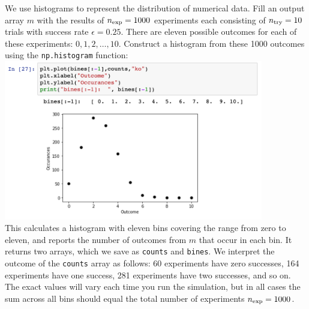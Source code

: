 We use histograms to represent the distribution of numerical data.
Fill an output array $m$ with the results of $n_{\rm exp} = 1000$
experiments each consisting of $n_{\rm try}=10$ trials with success rate
$\epsilon=0.25$.  There are eleven possible outcomes for each of these
experiments: $0,1,2,\ldots,10$.  Construct a histogram from these 1000
outcomes using the {\tt np.histogram} function:\\
\includegraphics[width=0.85\textwidth]{figs/labs/distributions/makehist.png} \\
This calculates a histogram with eleven bins covering the range from
zero to eleven, and reports the number of outcomes from $m$ that occur
in each bin.  It returns two arrays, which we save as {\tt counts} and
{\tt bines}.  We interpret the outcome of the {\tt counts} array as follows:  60
experiments have zero successes, 164 experiments have one success, 281
experiments have two successes, and so on.  The exact values will vary
each time you run the simulation, but in all cases the sum across all
bins should equal the total number of experiments $n_{\rm exp} =
1000$.


